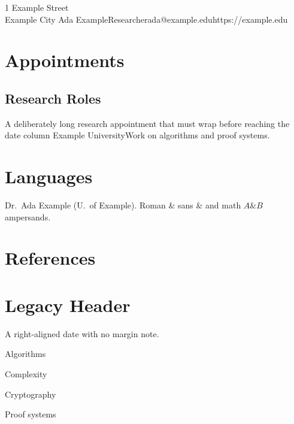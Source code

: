 \documentclass[english,letterpaper,11pt]{article}
\begin{document}
{1 Example Street\\Example City}
{Ada Example}{Researcher}{ada@example.edu}{https://example.edu}{}{}

\section{Appointments}
\subsection{Research Roles}
{A deliberately long research appointment that must wrap before reaching the date column}
{Example University}{Work on algorithms and proof systems.}

\section{Languages}
 Dr.\ Ada Example (U.\ of Example).
Roman \& sans {\sffamily \&} and math $A\&B$ ampersands.

\section{References}
\begin{refcolumns}
\end{refcolumns}

\newpage
{}
\section{Legacy Header}
 A right-aligned date with no margin note.
\begin{ditemize}
  \item Algorithms
  \item Complexity
  \item Cryptography
  \item Proof systems
\end{ditemize}
\end{document}

